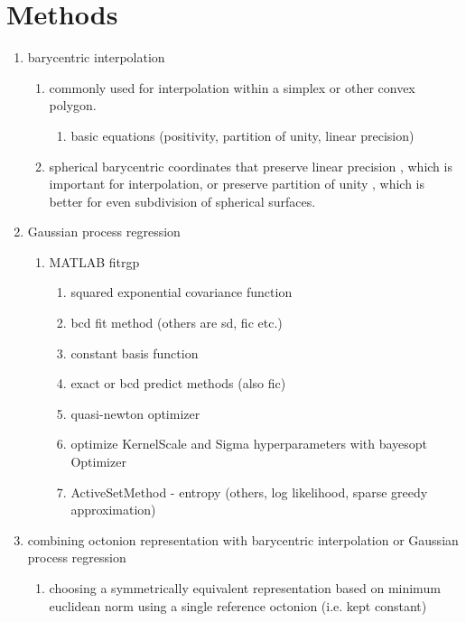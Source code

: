 \documentclass[preprint,12pt]{elsarticle}
\begin{document}
\section{Methods}
\begin{enumerate}
    \item barycentric interpolation
    \begin{enumerate}
        \item commonly used for interpolation within a simplex or other convex polygon.
        \begin{enumerate}
            \item basic equations (positivity, partition of unity, linear precision) \cite{Langer2006SphericalCoordinates}
        \end{enumerate}
        \item spherical barycentric coordinates that preserve linear precision \cite{Langer2006SphericalCoordinates}, which is important for interpolation, or preserve partition of unity \cite{Lei2020ASystems}, which is better for even subdivision of spherical surfaces.
    \end{enumerate}
    \item Gaussian process regression
    \begin{enumerate}
        \item MATLAB fitrgp
        \begin{enumerate}
            \item squared exponential covariance function
            \item bcd fit method (others are sd, fic etc.)
            \item constant basis function
            \item exact or bcd predict methods (also fic)
            \item quasi-newton optimizer
            \item optimize KernelScale and Sigma hyperparameters with bayesopt Optimizer
            \item ActiveSetMethod - entropy (others, log likelihood, sparse greedy approximation)
        \end{enumerate}
    \end{enumerate}
\item combining octonion representation with barycentric interpolation or Gaussian process regression
    \begin{enumerate}
        \item choosing a symmetrically equivalent representation based on minimum euclidean norm using a single reference octonion (i.e. kept constant)

\end{enumerate}
\end{enumerate}
\end{document}
